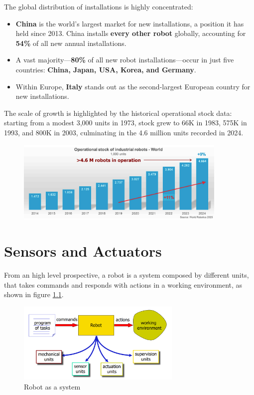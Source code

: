 \documentclass[10pt, letterpaper]{report}
\begin{document}
The global distribution of installations is highly concentrated:
\begin{itemize}
    \item \textbf{China} is the world's largest market for new installations, a position it has held since 2013. China installs \textbf{every other robot} globally, accounting for \textbf{54\%} of all new annual installations.
    \item A vast majority—\textbf{80\%} of all new robot installations—occur in just five countries: \textbf{China, Japan, USA, Korea, and Germany}.
    \item Within Europe, \textbf{Italy} stands out as the second-largest European country for new installations.
\end{itemize}

The scale of growth is highlighted by the historical operational stock data: starting from a modest 3,000 units in 1973, stock grew to 66K in 1983, 575K in 1993, and 800K in 2003, culminating in the 4.6 million units recorded in 2024.

\begin{figure}[h!]
    \centering
    \includegraphics[width=0.9\textwidth ]{images/op_stocks.png} 
\end{figure}

\chapter{Sensors and Actuators}
From an high level prospective, a robot is a system composed by different units, that takes commands and responds with actions in a working environment, as shown in figure \ref{fig:system}.
\begin{figure}[h!]
    \centering
    \includegraphics[width=0.7\textwidth ]{images/robosystem.png} 
    \caption{Robot as a system}
    \label{fig:system}
\end{figure}
\end{document}
